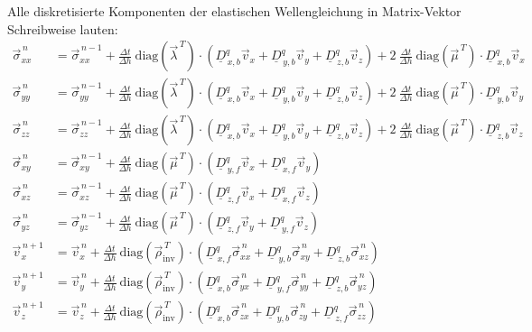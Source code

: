 \documentclass[pdftex,a4paper,parskip,listof=totoc,bibliography=totoc,onehalfspacing,12pt]{scrreprt}
\begin{document}
Alle diskretisierte Komponenten der elastischen Wellengleichung in Matrix-Vektor Schreibweise lauten:
\begin{align*}
	\vec{\sigma}_{xx}^{\,n} &= \vec{\sigma}_{xx}^{\,n-1} + \frac{\Delta t}{\Delta h}~ \mathrm{diag} \left( \vec{\lambda}^{\,T} \right) \cdot \left( \underline{D}_{\,x,b}^q \vec{v}_x +\underline{D}_{\,y,b}^q \vec{v}_y + \underline{D}_{\,z,b}^q \vec{v}_z \right) + 2~ \frac{\Delta t}{\Delta h} ~\mathrm{diag} \left( \vec{\mu}^{\,T} \right) \cdot \underline{D}_{\,x,b}^q \vec{v}_x\\
	\vec{\sigma}_{yy}^{\,n} &= \vec{\sigma}_{yy}^{\,n-1} + \frac{\Delta t}{\Delta h}~ \mathrm{diag} \left( \vec{\lambda}^{\,T} \right) \cdot \left( \underline{D}_{\,x,b}^q \vec{v}_x +\underline{D}_{\,y,b}^q \vec{v}_y + \underline{D}_{\,z,b}^q \vec{v}_z \right) + 2~ \frac{\Delta t}{\Delta h} ~\mathrm{diag} \left( \vec{\mu}^{\,T} \right) \cdot \underline{D}_{\,y,b}^q \vec{v}_y\\
	\vec{\sigma}_{zz}^{\,n} &= \vec{\sigma}_{zz}^{\,n-1} + \frac{\Delta t}{\Delta h}~ \mathrm{diag} \left( \vec{\lambda}^{\,T} \right) \cdot \left( \underline{D}_{\,x,b}^q \vec{v}_x +\underline{D}_{\,y,b}^q \vec{v}_y + \underline{D}_{\,z,b}^q \vec{v}_z \right) + 2~ \frac{\Delta t}{\Delta h} ~\mathrm{diag} \left( \vec{\mu}^{\,T} \right) \cdot \underline{D}_{\,z,b}^q \vec{v}_z\\
	\vec{\sigma}_{xy}^{\,n} &= \vec{\sigma}_{xy}^{\,n-1} + \frac{\Delta t}{\Delta h}~ \mathrm{diag} \left( \vec{\mu}^{\,T} \right) \cdot \left( \underline{D}_{\,y,f}^q \vec{v}_x + \underline{D}_{\,x,f}^q \vec{v}_y \right)\\
	\vec{\sigma}_{xz}^{\,n} &= \vec{\sigma}_{xz}^{\,n-1} + \frac{\Delta t}{\Delta h}~ \mathrm{diag} \left( \vec{\mu}^{\,T} \right) \cdot \left( \underline{D}_{\,z,f}^q \vec{v}_x + \underline{D}_{\,x,f}^q \vec{v}_z \right)\\
	\vec{\sigma}_{yz}^{\,n} &= \vec{\sigma}_{yz}^{\,n-1} + \frac{\Delta t}{\Delta h}~ \mathrm{diag} \left( \vec{\mu}^{\,T} \right) \cdot \left( \underline{D}_{\,z,f}^q \vec{v}_y + \underline{D}_{\,y,f}^q \vec{v}_z \right)\\
	\vec{v}_x^{\,n+1} &= \vec{v}_x^{\,n} + \frac{\Delta t}{\Delta h} ~ \mathrm{diag} \left( \vec{\rho}_\mathrm{inv}^{\,T} \right) \cdot \left( \underline{D}_{\,x,f}^q \vec{\sigma}_{xx}^{\,n} + \underline{D}_{\,y,b}^q \vec{\sigma}_{xy}^{\,n} + \underline{D}_{\,z,b}^q \vec{\sigma}_{xz}^{\,n} \right)\\
	\vec{v}_y^{\,n+1} &= \vec{v}_y^{\,n} + \frac{\Delta t}{\Delta h} ~ \mathrm{diag} \left( \vec{\rho}_\mathrm{inv}^{\,T} \right) \cdot \left( \underline{D}_{\,x,b}^q \vec{\sigma}_{yx}^{\,n} + \underline{D}_{\,y,f}^q \vec{\sigma}_{yy}^{\,n} + \underline{D}_{\,z,b}^q \vec{\sigma}_{yz}^{\,n} \right)\\
	\vec{v}_z^{\,n+1} &= \vec{v}_z^{\,n} + \frac{\Delta t}{\Delta h} ~ \mathrm{diag} \left( \vec{\rho}_\mathrm{inv}^{\,T} \right) \cdot \left( \underline{D}_{\,x,b}^q \vec{\sigma}_{zx}^{\,n} + \underline{D}_{\,y,b}^q \vec{\sigma}_{zy}^{\,n} + \underline{D}_{\,z,f}^q \vec{\sigma}_{zz}^{\,n} \right)\\
\end{align*}
\end{document}
